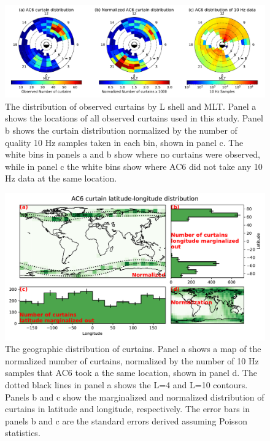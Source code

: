 \documentclass[draft]{agujournal2019}
\begin{document}
\begin{figure}
\includegraphics[width=\textwidth]{fig3_v3.pdf}
\caption{The distribution of observed curtains by L shell and MLT. Panel a shows the locations of all observed curtains used in this study. Panel b shows the curtain distribution normalized by the number of quality 10 Hz samples taken in each bin, shown in panel c. The white bins in panels a and b show where no curtains were observed, while in panel c the white bins show where AC6 did not take any 10 Hz data at the same location.}
\label{l_mlt_dist}
\end{figure}

\begin{figure}
\includegraphics[width=\textwidth]{curtain_lat_lon.pdf}
\caption{The geographic distribution of curtains. Panel a shows a map of the normalized number of curtains, normalized by the number of 10 Hz samples that AC6 took a the same location, shown in panel d. The dotted black lines in panel a shows the L=4 and L=10 contours. Panels b and c show the marginalized and normalized distribution of curtains in latitude and longitude, respectively. The error bars in panels b and c are the standard errors derived assuming Poisson statistics.}
\label{curtain_lat_lon}
\end{figure}
\end{document}
